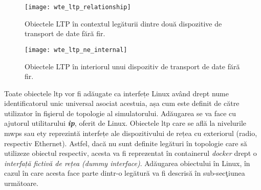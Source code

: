 \begin{figure}[h]
	\centering
	\texttt{[image: wte\_ltp\_relationship]}
	\caption{Obiectele LTP în contextul legăturii dintre două dispozitive de transport de date fără fir.}
	\label{fig:wte_ltp_relationship}
\end{figure}

\begin{figure}[h]
	\centering
	\texttt{[image: wte\_ltp\_ne\_internal]}
	\caption{Obiectele LTP în interiorul unui dispozitiv de transport de date fără fir.}
	\label{fig:wte_ltp_ne_internal}
\end{figure}

Toate obiectele \gls{ltp} vor fi adăugate ca interfețe Linux având drept nume identificatorul unic universal asociat acestuia, așa cum este definit de către utilizator în fişierul de topologie al simulatorului. Adăugarea se va face cu ajutorul utilitarului \textit{\textbf{ip}}, oferit de Linux. Obiectele \gls{ltp} care se află la nivelurile \gls{mwps} sau \gls{ety} reprezintă interfețe ale dispozitivului de rețea cu exteriorul (radio, respectiv Ethernet). Astfel, dacă nu sunt definite legături în topologie care să utilizeze obiectul respectiv, acesta va fi reprezentat în containerul \textit{docker} drept o \textit{interfață fictivă de rețea (dummy interface)}. Adăugarea obiectului în Linux, în cazul în care acesta face parte dintr-o legătură va fi descrisă în sub-secţiunea următoare.

